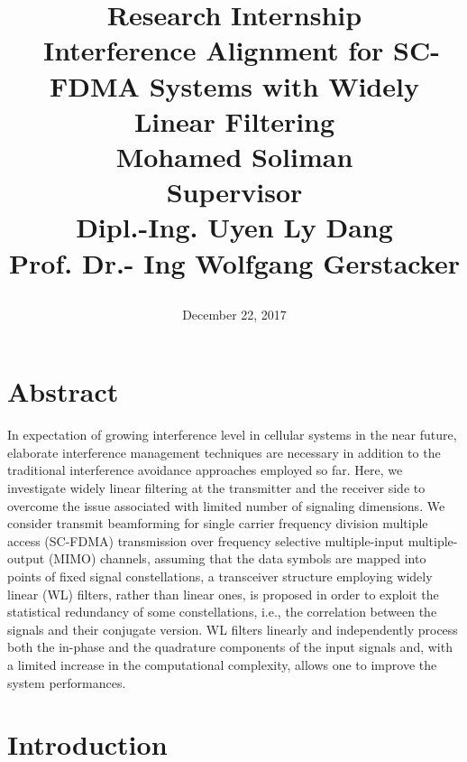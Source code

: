 \documentclass[12pt,a4paper,notitlepage,twoside,headsepline]{scrartcl}
\begin{document}
\begin{titlepage}
\title{
\begin{center}
    \textbf {Research Internship}  \\[0.5cm]  
    \textbf{\Large\ Interference Alignment for SC-FDMA Systems with Widely Linear Filtering}  \\ [0.3cm]
    \textbf{\Large Mohamed Soliman} \\[0.3cm]    
    \textbf{\small Supervisor}\\[0.3cm]
    \textbf{\small Dipl.-Ing. Uyen Ly Dang}\\[0.1cm]
	\textbf{\small Prof. Dr.- Ing Wolfgang Gerstacker}\\[0.1cm]				
\end{center}
}
\date{December 22, 2017}
\end{titlepage}

\maketitle

\section*{Abstract}
In expectation of growing interference level in cellular systems in the near future, elaborate interference management techniques are necessary in addition to the traditional interference avoidance approaches employed so far. Here, we investigate widely linear filtering at the transmitter and the receiver side to overcome the issue associated with limited number of signaling dimensions. We consider transmit beamforming for single carrier frequency division multiple access (SC-FDMA) transmission over frequency selective multiple-input multiple-output (MIMO) channels, assuming that the data symbols are mapped into points of fixed signal constellations, a transceiver structure employing widely linear (WL) filters, rather than linear ones, is proposed in order to exploit the statistical redundancy of some constellations, i.e., the correlation between the signals and their conjugate version. WL filters linearly and independently process both the in-phase and the quadrature components of the input signals and, with a limited increase in the computational complexity, allows one to improve the system performances.

\section{Introduction}
\end{document}

